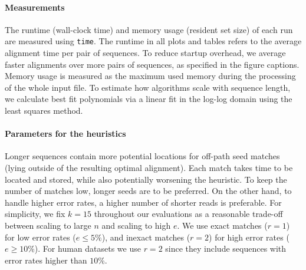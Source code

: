 \paragraph{Measurements}
The runtime (wall-clock time) and memory usage (resident set size) of each run
are measured using \texttt{time}. The runtime in all plots and tables refers to
the average alignment time per pair of sequences. To reduce startup overhead,
we average faster alignments over more pairs of sequences, as specified in the figure
captions. Memory usage is measured as the maximum used memory during the
processing of the whole input file. To estimate how algorithms scale with
sequence length, we calculate best fit polynomials via a linear fit in the
log-log domain using the least squares method.

\paragraph{Parameters for the \A heuristics}
Longer sequences contain more potential locations for off-path seed matches
(\ie lying outside of the resulting optimal alignment). Each match takes time
to be located and stored, while also potentially worsening the heuristic. To
keep the number of matches low, longer seeds are to be preferred. On the other
hand, to handle higher error rates, a higher number of shorter reads is
preferable. For simplicity, we fix $k{=}15$ throughout our evaluations as a
reasonable trade-off between scaling to large $n$ and scaling to high $e$. We
use exact matches ($r{=}1$) for low error rates ($e {\leq} 5\%$), and inexact
matches ($r{=}2$) for high error rates ($e{\geq}10\%$). For human
datasets we use $r{=}2$ since they include sequences with error rates
higher than $10\%$.
